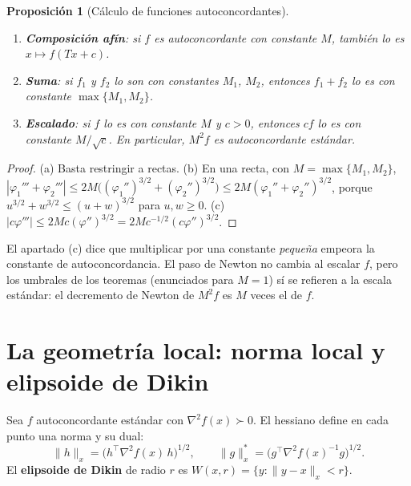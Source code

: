 \documentclass[11pt,a4paper,oneside]{book}
\newtheorem{proposicion}[teorema]{Proposición}
\theoremstyle{definition}
\theoremstyle{remark}
\newcommand{\T}{^{\top}}
\newcommand{\nrm}[1]{\lVert #1\rVert}
\newcommand{\abs}[1]{\left\lvert #1\right\rvert}
\begin{document}
\begin{proposicion}[Cálculo de funciones autoconcordantes]\label{prop:sc-calculo}
\begin{enumerate}[label=(\alph*)]
  \item \textbf{Composición afín}: si $f$ es autoconcordante con constante $M$, también lo es $x\mapsto f(Tx+c)$.
  \item \textbf{Suma}: si $f_1$ y $f_2$ lo son con constantes $M_1$, $M_2$, entonces $f_1+f_2$ lo es con constante $\max\{M_1,M_2\}$.
  \item \textbf{Escalado}: si $f$ lo es con constante $M$ y $c>0$, entonces $cf$ lo es con constante $M/\sqrt{c}$.
        En particular, $M^2 f$ es autoconcordante estándar.
\end{enumerate}
\end{proposicion}

\begin{proof}
(a) Basta restringir a rectas. (b) En una recta, con $M=\max\{M_1,M_2\}$,
$\abs{\varphi_1'''+\varphi_2'''}\le 2M\bigl((\varphi_1'')^{3/2}+(\varphi_2'')^{3/2}\bigr)\le 2M(\varphi_1''+\varphi_2'')^{3/2}$,
porque $u^{3/2}+w^{3/2}\le(u+w)^{3/2}$ para $u,w\ge0$. (c) $\abs{c\varphi'''}\le 2Mc(\varphi'')^{3/2}=2Mc^{-1/2}(c\varphi'')^{3/2}$.
\end{proof}

\begin{cuidado}
El apartado (c) dice que multiplicar por una constante \emph{pequeña} empeora la constante de
autoconcordancia. El paso de Newton no cambia al escalar $f$, pero los umbrales de los teoremas (enunciados
para $M=1$) sí se refieren a la escala estándar: el decremento de Newton de $M^2f$ es $M$ veces el de $f$.
\end{cuidado}

\section{La geometría local: norma local y elipsoide de Dikin}

Sea $f$ autoconcordante estándar con $\nabla^2 f(x)\succ0$. El hessiano define en cada punto una norma y su dual:
\[ \nrm{h}_x=\bigl(h\T\nabla^2 f(x)\,h\bigr)^{1/2},\qquad \nrm{g}_x^{*}=\bigl(g\T\nabla^2 f(x)^{-1}g\bigr)^{1/2}. \]
El \textbf{elipsoide de Dikin} de radio $r$ es $W(x,r)=\{y:\nrm{y-x}_x<r\}$.
\end{document}
